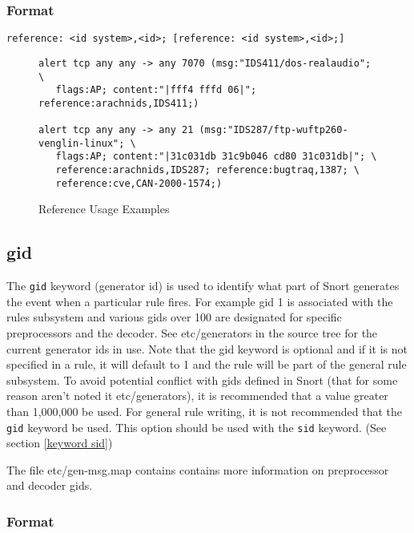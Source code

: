 \documentclass[english]{report}
\begin{document}
\subsubsection{Format}

\begin{verbatim}
reference: <id system>,<id>; [reference: <id system>,<id>;]
\end{verbatim}

\begin{figure}[!hbpt]
\begin{verbatim}
alert tcp any any -> any 7070 (msg:"IDS411/dos-realaudio"; \
   flags:AP; content:"|fff4 fffd 06|"; reference:arachnids,IDS411;)

alert tcp any any -> any 21 (msg:"IDS287/ftp-wuftp260-venglin-linux"; \
   flags:AP; content:"|31c031db 31c9b046 cd80 31c031db|"; \
   reference:arachnids,IDS287; reference:bugtraq,1387; \
   reference:cve,CAN-2000-1574;)
\end{verbatim}

\caption{Reference Usage Examples\label{example reference rule}}
\end{figure}


\subsection{gid\label{keyword gid}}

The \texttt{gid} keyword (generator id) is used to identify what part of Snort generates the event
when a particular rule fires.
For example gid 1 is associated with the rules subsystem and various gids over 100 are designated
for specific preprocessors and the decoder.  See etc/generators in the source tree for the current generator
ids in use.  Note that the gid keyword is optional and if it is not specified in a rule, it will default to 1
and the rule will be part of the general rule subsystem.  To avoid potential conflict with gids defined in Snort (that
for some reason aren't noted it etc/generators), it is recommended that a value greater than 1,000,000 be used. 
For general rule writing, it is not recommended that the \texttt{gid} keyword be used.
This option should be used with the \texttt{sid} keyword.  (See section \ref{keyword sid})

The file etc/gen-msg.map contains contains more information on preprocessor and decoder gids.

\subsubsection{Format}
\end{document}

